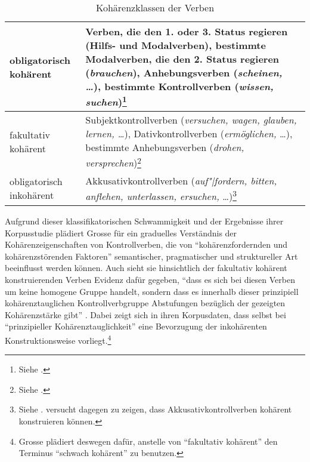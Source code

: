 \begin{table}[ht]
\begin{center}

\begin{tabular}{p{2.3cm}|p{8cm}}
obligatorisch koh\"arent & Verben, die den 1. oder 3. Status regieren (Hilfs- und Modalverben), bestimmte Modalverben, die den 2. Status regieren ({\it brauchen}), Anhebungsverben ({\it scheinen, \ldots}), bestimmte Kontrollverben ({\it wissen, suchen})\footnote{Siehe \cite{Reis:01}.}\\
\hline
fakultativ \mbox{kohärent} & Subjektkontrollverben ({\it versuchen, wagen, glauben, lernen, \ldots}), Dativkontrollverben ({\it ermöglichen,} \ldots), bestimmte Anhebungsverben ({\it drohen, versprechen})\footnote{Siehe \cite{Reis:05}.} \\
\hline
obligatorisch inkohärent & Akkusativkontrollverben ({\it auf"|fordern, bitten, anflehen, unterlassen, ersuchen,} \ldots)\footnote{Siehe \citet[55]{Grosse:05}. \citet[Section~2.1.7]{Mueller:02} versucht dagegen zu zeigen, dass Akkusativkontrollverben kohärent konstruieren können.} \\
\end{tabular}

\end{center}
\caption{Kohärenzklassen der Verben\label{fig-kohaerenzklassen}}
\end{table}


Aufgrund dieser klassifikatorischen Schwammigkeit und der Ergebnisse ihrer Korpusstudie plädiert Grosse für ein graduelles Verständnis der Kohärenzeigenschaften von Kontrollverben, die von "`kohärenzfordernden und kohärenzstörenden Faktoren"' semantischer, pragmatischer und struktureller Art beeinflusst werden können. Auch sieht sie hinsichtlich der fakultativ kohärent konstruierenden Verben Evidenz dafür gegeben, "`dass es sich bei diesen Verben um keine homogene Gruppe handelt, sondern dass es innerhalb dieser prinzipiell kohärenztauglichen Kontrollverbgruppe Abstufungen bezüglich der gezeigten Kohärenzstärke gibt"' \citep[11]{Grosse:05}. Dabei zeigt sich in ihren Korpusdaten, dass selbst bei "`prinzipieller Kohärenztauglichkeit"' eine Bevorzugung der  inkohärenten Konstruktionsweise vorliegt.\footnote{Grosse plädiert deswegen dafür, anstelle von "`fakultativ kohärent"' den Terminus "`schwach kohärent"' zu benutzen.} 

